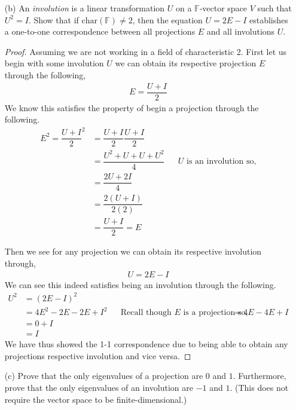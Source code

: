 \documentclass[12pt]{article}
\begin{document}
\begin{itemize}
\begin{itemize}
    \vspace{.3cm}
    \item[(b)]
    An \textit{involution} is a linear transformation $U$ on a $\mathbb{F}$-vector space $V$ such that $U^2 = I$. Show that if $\text{char}(\mathbb{F}) \neq 2$, then the equation $U = 2E - I$ establishes a one-to-one correspondence between all projections $E$ and all involutions $U$.
    \begin{proof}
        Assuming we are not working in a field of characteristic 2. First let us begin with some involution $U$ we can obtain its respective projection $E$ through the following,
        \begin{align*}
            E = \dfrac{U + I}{2}
        \end{align*}
        We know this satisfies the property of begin a projection through the following. 
        \begin{align*}
            E^2 = \dfrac{U+I}{2}^2 &= \dfrac{U+I}{2}\dfrac{U+I}{2} \\
            &= \dfrac{U^2 + U + U + U^2}{4}  && \text{$U$ is an involution so,}\\
            &= \dfrac{2U + 2I}{4} \\
            &= \dfrac{2(U + I)}{2(2)} \\
            &= \dfrac{U + I}{2} = E
        \end{align*}
    

    Then we see for any projection we can obtain its respective involution through,
    \begin{align*}
        U = 2E - I
    \end{align*}
    We can see this indeed satisfies being an involution through the following.
    \begin{align*}
        U^2 &= (2E - I)^2 \\
        &= 4E^2 -2E -2E + I^2 && \text{Recall though $E$ is a projection so,}
        &= 4E - 4E + I \\
        &= 0 + I \\
        &= I
    \end{align*}
    We have thus showed the 1-1 correspondence due to being able to obtain any projections respective involution and vice versa. 
\end{proof}
    \vspace{.3cm}
    \item[(c)]
    Prove that the only eigenvalues of a projection are $0$ and $1$. Furthermore, prove that the only eigenvalues of an involution are $-1$ and $1$. (This does not require the vector space to be finite-dimensional.)
    

\end{itemize}
\end{itemize}
\end{document}
